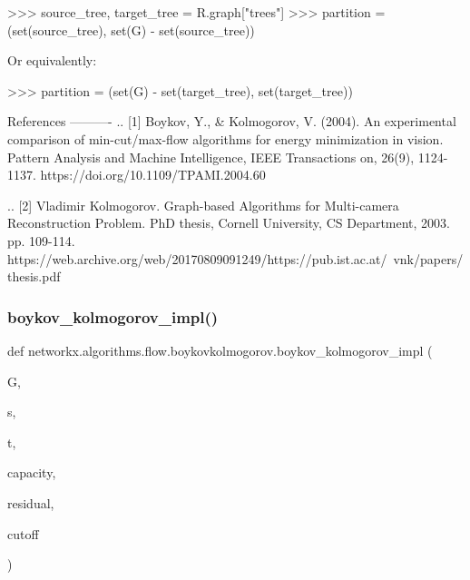 \begin{DoxyVerb}
>>> source_tree, target_tree = R.graph["trees"]
>>> partition = (set(source_tree), set(G) - set(source_tree))

Or equivalently:

>>> partition = (set(G) - set(target_tree), set(target_tree))

References
----------
.. [1] Boykov, Y., & Kolmogorov, V. (2004). An experimental comparison
       of min-cut/max-flow algorithms for energy minimization in vision.
       Pattern Analysis and Machine Intelligence, IEEE Transactions on,
       26(9), 1124-1137.
       https://doi.org/10.1109/TPAMI.2004.60

.. [2] Vladimir Kolmogorov. Graph-based Algorithms for Multi-camera
       Reconstruction Problem. PhD thesis, Cornell University, CS Department,
       2003. pp. 109-114.
       https://web.archive.org/web/20170809091249/https://pub.ist.ac.at/~vnk/papers/thesis.pdf\end{DoxyVerb}
 \mbox{\label{namespacenetworkx_1_1algorithms_1_1flow_1_1boykovkolmogorov_af0a08cc4141de23cb0415f72f6a756c5}} 
\subsubsection{\texorpdfstring{boykov\+\_\+kolmogorov\+\_\+impl()}{boykov\_kolmogorov\_impl()}}
{\footnotesize\ttfamily def networkx.\+algorithms.\+flow.\+boykovkolmogorov.\+boykov\+\_\+kolmogorov\+\_\+impl (\begin{DoxyParamCaption}\item[{}]{G,  }\item[{}]{s,  }\item[{}]{t,  }\item[{}]{capacity,  }\item[{}]{residual,  }\item[{}]{cutoff }\end{DoxyParamCaption})}

